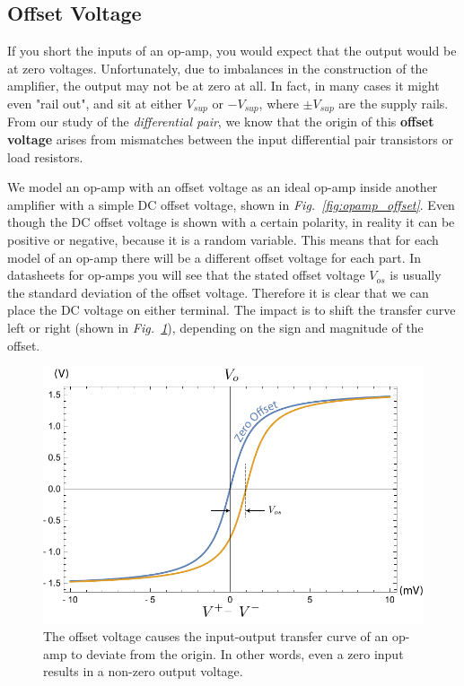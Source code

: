 \subsection{Offset Voltage}
If you short the inputs of an op-amp, you would expect that the output would be at zero voltages.  Unfortunately, due to imbalances in the construction of the amplifier, the output may not be at zero at all.  In fact, in many cases it might even "rail out", and sit at either $V_{sup}$ or $-V_{sup}$, where $\pm V_{sup}$ are the supply rails.  From our study of the \textit{differential pair}, we know that the origin of this \textbf{offset voltage} arises from mismatches between the input differential pair transistors or load resistors.  

We model an op-amp with an offset voltage as an ideal op-amp inside another amplifier with a simple DC offset voltage, shown in \emph{Fig.~\ref{fig:opamp_offset}}.  Even though the DC offset voltage is shown with a certain polarity, in reality it can be positive or negative, because it is a random variable.  This means that for each model of an op-amp there will be a different offset voltage for each part.  In datasheets for op-amps you will see that the stated offset voltage $V_{os}$ is usually the standard deviation of the offset voltage.  Therefore it is clear that we can place the DC voltage on either terminal.  The impact is to shift the transfer curve left or right (shown in \emph{Fig.~\ref{fig:opamp_offset_plot}}), depending on the sign and magnitude of the offset.
\begin{figure}[H]
\centering
\includegraphics[width=.75\columnwidth]{opamp_offset_plot}
\caption{The offset voltage causes the input-output transfer curve of an op-amp to deviate from the origin.  In other words, even a zero input results in a non-zero output voltage.}
\label{fig:opamp_offset_plot}
\end{figure}
\newpage
